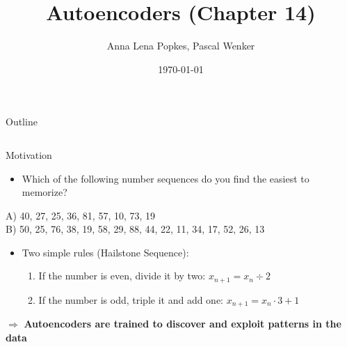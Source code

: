 \documentclass[handout]{beamer}
\title{Autoencoders (Chapter 14)}
\author{Anna Lena Popkes, Pascal Wenker}%
\institute{Deep Learning Seminar \\ University of Bonn}
\date{\today}
\begin{document}
\frame{\titlepage}
\begin{frame}[allowframebreaks]{Outline}
   \begin{columns}
      \begin{column}{0.49\linewidth}
         \tableofcontents[sections=1-5, hideallsubsections]
      \end{column}\hfill%
      \begin{column}{0.49\linewidth}
          \tableofcontents[sections=6-10, hideallsubsections]
      \end{column}
   \end{columns}
\end{frame}

\begin{frame}[t]{Motivation}
    \begin{itemize}
   \item Which of the following number sequences do you find the easiest to memorize?
    \end{itemize}
           A) 40, 27, 25, 36, 81, 57, 10, 73, 19 \\
           B) { 50, 25}, 76, 38, {19, 58}, 29, 88, 44, 22, 11, 34, 17, 52, 26, 13 
\pause
\pause
   \begin{itemize}
       \item Two simple rules (Hailstone Sequence):
           \begin{enumerate}
               \item If the number is even, divide it by two: {\color{red} $x_{n+1} = x_n \div 2$}
               \item If the number is odd, triple it and add one: {\color{blue} $x_{n+1} = x_n \cdot 3 + 1$}
           \end{enumerate}
           \pause
   \end{itemize} 
           $\Rightarrow$ \textbf{Autoencoders are trained to discover and exploit patterns in the data}
\end{frame}

\end{document}
